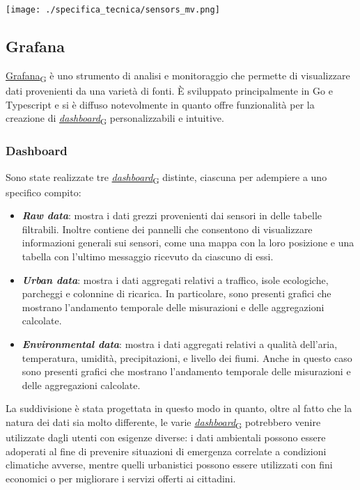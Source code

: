 \begin{center}
	\texttt{[image: ./specifica\_tecnica/sensors\_mv.png]}
\end{center}

\pagebreak
\subsection{Grafana}
\href{https://7last.github.io/docs/pb/documentazione-interna/glossario\#grafana}{Grafana\textsubscript{G}} è uno strumento di analisi e monitoraggio che permette di visualizzare dati provenienti da una varietà di fonti. È sviluppato principalmente in Go e Typescript e si è diffuso notevolmente
in quanto offre funzionalità per la creazione di \href{https://7last.github.io/docs/pb/documentazione-interna/glossario\#dashboard}{\textit{dashboard}\textsubscript{G}} personalizzabili e intuitive.
\subsubsection{Dashboard}
Sono state realizzate tre \href{https://7last.github.io/docs/pb/documentazione-interna/glossario\#dashboard}{\textit{dashboard}\textsubscript{G}} distinte, ciascuna per adempiere a uno specifico compito:
\begin{itemize}
	\item \textbf{\textit{Raw data}}: mostra i dati grezzi provenienti dai sensori in delle tabelle filtrabili. Inoltre contiene dei pannelli che consentono
	      di visualizzare informazioni generali sui sensori, come una mappa con la loro posizione e una tabella con l'ultimo messaggio ricevuto da ciascuno di essi.
	\item \textbf{\textit{Urban data}}: mostra i dati aggregati relativi a traffico, isole ecologiche, parcheggi e colonnine di ricarica. In particolare, sono presenti
	      grafici che mostrano l'andamento temporale delle misurazioni e delle aggregazioni calcolate.
	\item \textbf{\textit{Environmental data}}: mostra i dati aggregati relativi a qualità dell'aria, temperatura, umidità, precipitazioni, e livello dei fiumi.
	      Anche in questo caso sono presenti grafici che mostrano l'andamento temporale delle misurazioni e delle aggregazioni calcolate.
\end{itemize}
La suddivisione è stata progettata in questo modo in quanto, oltre al fatto che la natura dei dati sia molto differente, le varie \href{https://7last.github.io/docs/pb/documentazione-interna/glossario\#dashboard}{\textit{dashboard}\textsubscript{G}} potrebbero venire utilizzate dagli utenti con esigenze diverse:
i dati ambientali possono essere adoperati al fine di prevenire situazioni di emergenza correlate a condizioni climatiche avverse, mentre quelli urbanistici possono essere utilizzati con fini economici
o per migliorare i servizi offerti ai cittadini.


